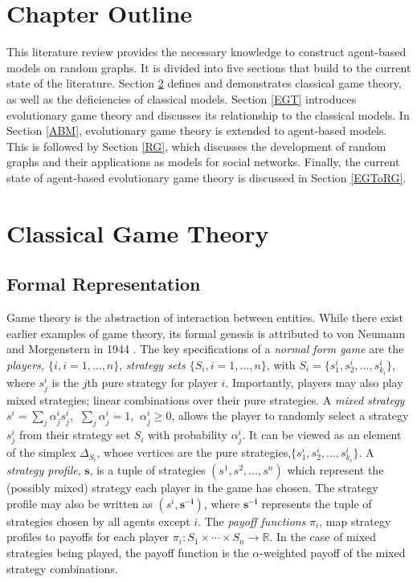 \section{Chapter Outline}
This literature review provides the necessary knowledge to construct agent-based models on random graphs. It is divided into five sections that build to the current state of the literature. Section \ref{CGT} defines and demonstrates classical game theory, as well as the deficiencies of classical models. Section \ref{EGT} introduces evolutionary game theory and discusses its relationship to the classical models. In Section \ref{ABM}, evolutionary game theory is extended to agent-based models. This is followed by Section \ref{RG}, which discusses the development of random graphs and their applications as models for social networks. Finally, the current state of agent-based evolutionary game theory is discussed in Section \ref{EGToRG}. 

\section{Classical Game Theory} \label{CGT}

\subsection{Formal Representation}
Game theory is the abstraction of interaction between entities. While there exist earlier examples of game theory, its formal genesis is attributed to von Neumann and Morgenstern in 1944 \cite{RN99, RN27}. The key specifications of a \emph{normal form game} are the \emph{players, $\{i, i = 1, \dots ,n\}$}, \emph{strategy sets $ \{S_i, i = 1, \dots ,n\}$}, with $ S_i = \{s_{1}^i, s_{2}^i,\dots, s_{k_i}^i\}$, where $s_{j}^i$ is the $j$th pure strategy for player $i$. Importantly, players may also play mixed strategies; linear combinations over their pure strategies. A \emph{mixed strategy} $s^i = \sum_{j} \alpha_j^i s_{j}^i$, $~\sum_{j} \alpha_j^i = 1$, $~\alpha_j^i \geq 0$, allows the player to randomly select a strategy $s_{j}^i$ from their strategy set $S_i$ with probability $\alpha_j^i$. It can be viewed as an element of the simplex $\Delta_{S_i}$, whose vertices are the pure strategies,$\{s_{1}^i, s_{2}^i,\dots, s_{k_i}^i\}$.  A \emph{strategy profile}, $\mathbf{s}$, is a tuple of strategies $(s^1, s^2, \dots, s^n)$ which represent the (possibly mixed) strategy each player in the game has chosen. The strategy profile may also be written as $(s^i, \mathbf{s^{-i}})$, where $\mathbf{s^{-i}}$ represents the tuple of strategies chosen by all agents except $i$. The \emph{payoff functions} $\pi_i$, map strategy profiles to payoffs for each player $\pi_i: S_1 \times \cdots \times S_n \to \mathbb R$. In the case of mixed strategies being played, the payoff function is the $\alpha$-weighted payoff of the mixed strategy combinations. \\ %



